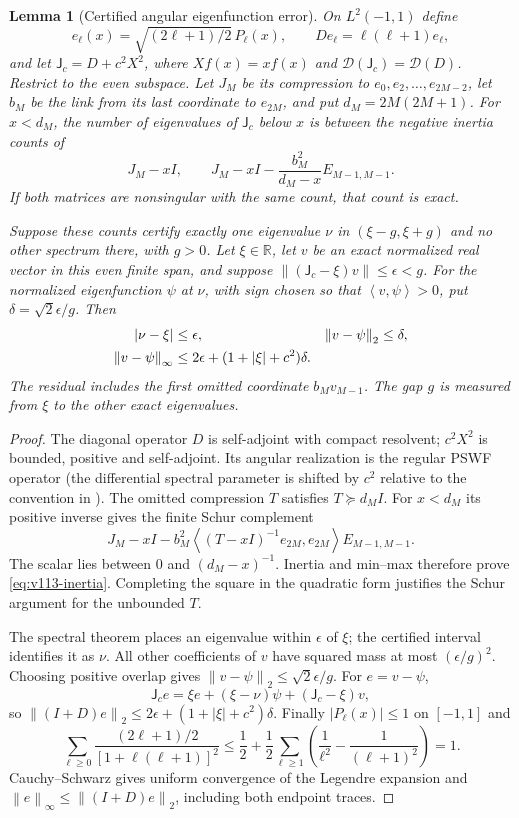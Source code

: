 \documentclass[11pt]{article}
\newtheorem{lemma}[theorem]{Lemma}
\theoremstyle{remark}
\newcommand{\norm}[1]{\left\lVert #1\right\rVert}
\newcommand{\ip}[2]{\left\langle #1,#2\right\rangle}
\begin{document}
\begin{lemma}[Certified angular eigenfunction error]
\label{lem:v113-angular}
On $L^2(-1,1)$ define
\[
 e_\ell(x)=\sqrt{(2\ell+1)/2}\,P_\ell(x),\qquad
 De_\ell=\ell(\ell+1)e_\ell,
\]
and let
$\mathsf J_c=D+c^2X^2$, where $Xf(x)=xf(x)$ and
$\mathcal D(\mathsf J_c)=\mathcal D(D)$.
Restrict to the even subspace. Let $J_M$ be its compression to
$e_0,e_2,\ldots,e_{2M-2}$, let $b_M$ be the link from its last
coordinate to $e_{2M}$, and put $d_M=2M(2M+1)$.
For $x<d_M$, the number of eigenvalues of $\mathsf J_c$ below $x$
is between the negative inertia counts of
\begin{equation}\label{eq:v113-inertia}
 J_M-xI,\qquad
 J_M-xI-\frac{b_M^2}{d_M-x}E_{M-1,M-1}.
\end{equation}
If both matrices are nonsingular with the same count, that count is exact.

Suppose these counts certify exactly one eigenvalue $\nu$ in
$(\xi-g,\xi+g)$ and no other spectrum there, with $g>0$.
Let $\xi\in\mathbb R$, let $v$ be an exact normalized real vector in
this even finite span, and suppose
$\norm{(\mathsf J_c-\xi)v}\le\epsilon<g$.
For the normalized eigenfunction $\psi$ at $\nu$, with sign chosen
so that $\ip v\psi>0$, put $\delta=\sqrt2\epsilon/g$.
Then
\begin{align}
 |\nu-\xi|&\le\epsilon,& \norm{v-\psi}_2&\le\delta,\notag\\
 \norm{v-\psi}_\infty
 &\le 2\epsilon+(1+|\xi|+c^2)\delta.
 \label{eq:v113-pointwise}
\end{align}
The residual includes the first omitted coordinate $b_Mv_{M-1}$.
The gap $g$ is measured from $\xi$ to the other exact eigenvalues.
\end{lemma}
\begin{proof}
The diagonal operator $D$ is self-adjoint with compact resolvent;
$c^2X^2$ is bounded, positive and self-adjoint. Its angular realization
is the regular PSWF operator (the differential spectral parameter is
shifted by $c^2$ relative to the convention in \cite{DLMFPSWF}).
The omitted compression $T$ satisfies $T\succeq d_MI$. For $x<d_M$
its positive inverse gives the finite Schur complement
\[
 J_M-xI-b_M^2\ip{(T-xI)^{-1}e_{2M}}{e_{2M}}E_{M-1,M-1}.
\]
The scalar lies between $0$ and $(d_M-x)^{-1}$. Inertia and min--max
therefore prove \eqref{eq:v113-inertia}. Completing the square in the
quadratic form justifies the Schur argument for the unbounded $T$.

The spectral theorem places an eigenvalue within $\epsilon$ of $\xi$;
the certified interval identifies it as $\nu$. All other coefficients
of $v$ have squared mass at most $(\epsilon/g)^2$. Choosing positive
overlap gives $\norm{v-\psi}_2\le\sqrt2\epsilon/g$.
For $e=v-\psi$,
\[
 \mathsf J_ce=\xi e+(\xi-\nu)\psi+(\mathsf J_c-\xi)v,
\]
so $\norm{(I+D)e}_2\le2\epsilon+(1+|\xi|+c^2)\delta$.
Finally $|P_\ell(x)|\le1$ on $[-1,1]$ and
\[
 \sum_{\ell\ge0}\frac{(2\ell+1)/2}{[1+\ell(\ell+1)]^2}
 \le\frac12+\frac12\sum_{\ell\ge1}
             \left(\frac1{\ell^2}-\frac1{(\ell+1)^2}\right)=1.
\]
Cauchy--Schwarz gives uniform convergence of the Legendre expansion and
$\norm e_\infty\le\norm{(I+D)e}_2$, including both endpoint traces.
\end{proof}
\end{document}
